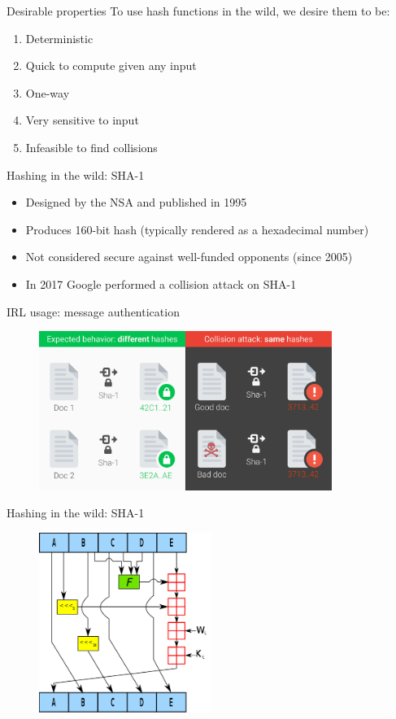 \documentclass[12pt,aspectratio=169]{beamer}
\renewcommand{\emph}[1]{{\color{mLightBrown}#1}}
\begin{document}
\begin{frame}{Desirable properties}
To use hash functions in the wild, we desire them to be:
\begin{enumerate}
	\item Deterministic
	\item Quick to compute given any input
	\item One-way
	\item Very sensitive to input
	\item Infeasible to find collisions
\end{enumerate}
\end{frame}

\begin{frame}{Hashing in the wild: SHA-1}
\begin{itemize}
	\item Designed by the NSA and published in 1995
	\item Produces 160-bit hash (typically rendered as a hexadecimal number)
	\item Not considered secure against well-funded opponents (since 2005)
	\item In 2017 Google performed a \emph{collision attack} on SHA-1
\end{itemize}
\end{frame}

\begin{frame}{IRL usage: message authentication}
\begin{figure}
	\includegraphics[width=0.85\textwidth]{hash_collision.png}
\end{figure}
\end{frame}

\begin{frame}{Hashing in the wild: SHA-1}
\begin{figure}
    \includegraphics[width=0.5\textwidth]{sha1.png}
\end{figure}
\end{frame}
\end{document}
